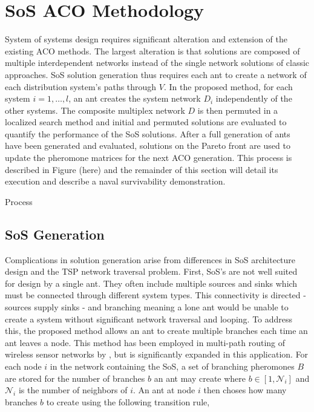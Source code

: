 \documentclass[preprint,12pt]{elsarticle}
\begin{document}
\section{SoS ACO Methodology}
System of systems design requires significant alteration and extension of the existing ACO methods. The largest alteration is that solutions are composed of multiple interdependent networks instead of the single network solutions of classic approaches. SoS solution generation thus requires each ant to create a network of each distribution system's paths through $V$. In the proposed method, for each system $i=1, \ldots, l$, an ant creates the system network $D_i$ independently of the other systems. The composite multiplex network $D$ is then permuted in a localized search method and initial and permuted solutions are evaluated to quantify the performance of the SoS solutions. After a full generation of ants have been generated and evaluated, solutions on the Pareto front are used to update the pheromone matrices for the next ACO generation. This process is described in Figure (here) and the remainder of this section will detail its execution and describe a naval survivability demonstration.  

Process




\subsection{SoS Generation} \label{sec:gen}


Complications in solution generation arise from differences in SoS architecture design and the TSP network traversal problem. First, SoS's are not well suited for design by a single ant. They often include multiple sources and sinks which must be connected through different system types. This connectivity is directed - sources supply sinks - and branching meaning a lone ant would be unable to create a system without significant network traversal and looping. To address this, the proposed method allows an ant to create multiple branches each time an ant leaves a node. This method has been employed in multi-path routing of wireless sensor networks by \cite{Yang2010}, but is significantly expanded in this application. For each node $i$ in the network containing the SoS, a set of branching pheromones $B$ are stored for the number of branches $b$ an ant may create where $b \in [1,\mathcal{N}_i]$ and $\mathcal{N}_i$ is the number of neighbors of $i$. An ant at node $i$ then choses how many branches $b$ to create using the following transition rule,
\end{document}

